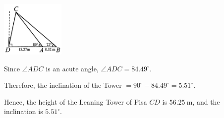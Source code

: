 \documentclass{report}
\begin{document}
\begin{question}
\begin{vwcol}[widths={0.6,0.4}, sep=8mm, rule=0pt,justify=flushleft]
            \vspace{5em}

            \includegraphics[width=0.23\textwidth]{assets/10-1.jpg}
        \end{vwcol}
        \vspace{-2em}
        \noindent Since $\angle ADC$ is an acute angle, $\angle ADC = 84.49^\circ$.

        \vspace{-0.8em}
        \noindent Therefore, the inclination of the Tower $= 90^\circ - 84.49^\circ = 5.51^\circ$.

        \vspace{-0.8em}
        \noindent Hence, the height of the Leaning Tower of Pisa $CD$ is $56.25 \mathrm{~m}$, and the inclination is $5.51^\circ$.
    \end{question}
\end{document}
